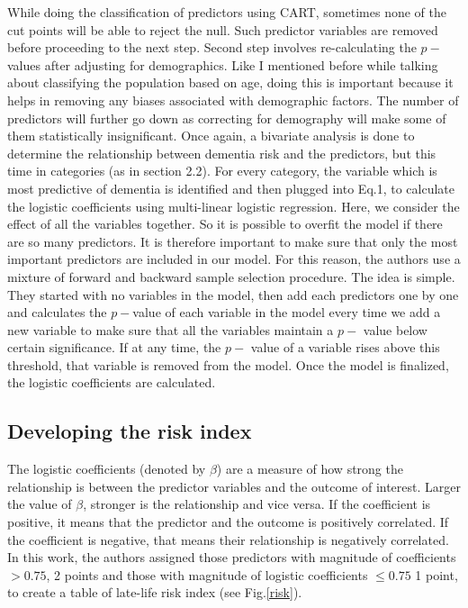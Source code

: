\documentclass[12pt,letterpaper]{article}
\begin{document}
While doing the classification of predictors using CART, sometimes none of the cut points will be able to reject the null. Such predictor variables are removed before proceeding to the next step. Second step involves re-calculating the $p-$values after adjusting for demographics. Like I mentioned before while talking about classifying the population based on age, doing this is important because it helps in removing any biases associated with demographic factors. The number of predictors will further go down as correcting for demography will make some of them statistically insignificant. Once again, a bivariate analysis is done to determine the relationship between dementia risk and the predictors, but this time in categories (as in section 2.2). For every category, the variable which is most predictive of dementia is identified and then plugged into Eq.1, to calculate the logistic coefficients using multi-linear logistic regression. Here, we consider the effect of all the variables together. So it is possible to overfit the model if there are so many predictors. It is therefore important to make sure that only the most important predictors are included in our model. For this reason, the authors use a mixture of forward and backward sample selection procedure. The idea is simple. They started with no variables in the model, then add each predictors one by one and calculates the $p-$value of each variable in the model every time we add a new variable to make sure that all the variables maintain a $p-$ value below certain significance. If at any time, the $p-$ value of a variable rises above this threshold, that variable is removed from the model. Once the model is finalized, the logistic coefficients are calculated.\\

\subsection{Developing the risk index}
The logistic coefficients (denoted by $\beta$) are a measure of how strong the relationship is between the predictor variables and the outcome of interest. Larger the value of $\beta$, stronger is the relationship and vice versa. If the coefficient is positive, it means that the predictor and the outcome is positively correlated. If the coefficient is negative, that means their relationship is negatively correlated. In this work, the authors assigned those predictors with magnitude of coefficients $>0.75$, 2 points and those with magnitude of logistic coefficients $\leq0.75$ 1 point, to create a table of late-life risk index (see Fig.\ref{risk}).\\
\end{document}
